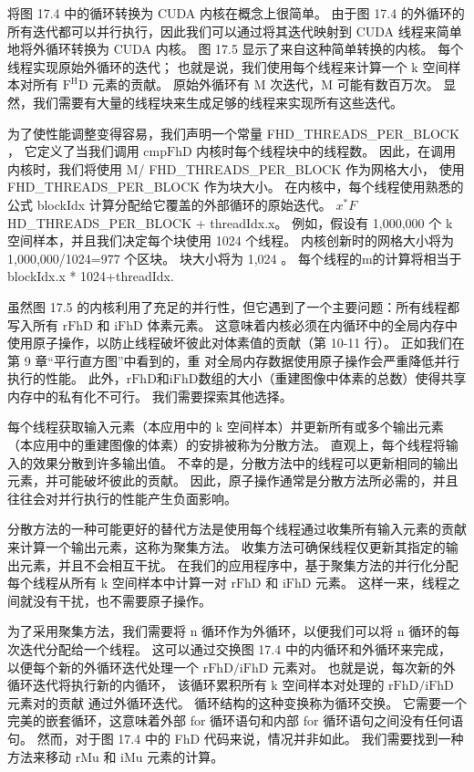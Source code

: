 将图 17.4 中的循环转换为 CUDA 内核在概念上很简单。 
由于图 17.4 的外循环的所有迭代都可以并行执行，因此我们可以通过将其迭代映射到 CUDA 线程来简单地将外循环转换为 CUDA 内核。 
图 17.5 显示了来自这种简单转换的内核。 每个线程实现原始外循环的迭代； 
也就是说，我们使用每个线程来计算一个 k 空间样本对所有 $\mathrm{F}^{\mathrm{H}} \mathrm{D}$ 元素的贡献。 
原始外循环有 $\mathrm{M}$ 次迭代，$\mathrm{M}$ 可能有数百万次。 
显然，我们需要有大量的线程块来生成足够的线程来实现所有这些迭代。

为了使性能调整变得容易，我们声明一个常量 FHD\_THREADS\_PER\_BLOCK ，
它定义了当我们调用 $\mathrm{cmpFhD}$ 内核时每个线程块中的线程数。 
因此，在调用内核时，我们将使用 M/ FHD\_THREADS\_PER\_BLOCK 作为网格大小，
使用 FHD\_THREADS\_PER\_BLOCK 作为块大小。 
在内核中，每个线程使用熟悉的公式 blockIdx 计算分配给它覆盖的外部循环的原始迭代。 
$x^{*} F$ HD\_THREADS\_PER\_BLOCK + threadIdx.x。 
例如，假设有 1,000,000 个 k 空间样本，并且我们决定每个块使用 1024 个线程。 
内核创新时的网格大小将为 1,000,000/1024=977 个区块。 块大小将为 1,024 。 
每个线程的$\mathrm{m}$的计算将相当于blockIdx.x * 1024+threadIdx.

虽然图 17.5 的内核利用了充足的并行性，但它遇到了一个主要问题：所有线程都写入所有 $\mathrm{rFhD}$ 
和 $\mathrm{iFhD}$ 体素元素。 
这意味着内核必须在内循环中的全局内存中使用原子操作，以防止线程破坏彼此对体素值的贡献（第 10-11 行）。 
正如我们在第 9 章“平行直方图”中看到的，重
对全局内存数据使用原子操作会严重降低并行执行的性能。 
此外，$\mathrm{rFhD}$和$\mathrm{iFhD}$数组的大小（重建图像中体素的总数）使得共享内存中的私有化不可行。 
我们需要探索其他选择。

每个线程获取输入元素（本应用中的 k 空间样本）并更新所有或多个输出元素（本应用中的重建图像的体素）的安排被称为分散方法。 
直观上，每个线程将输入的效果分散到许多输出值。 不幸的是，分散方法中的线程可以更新相同的输出元素，并可能破坏彼此的贡献。 
因此，原子操作通常是分散方法所必需的，并且往往会对并行执行的性能产生负面影响。

分散方法的一种可能更好的替代方法是使用每个线程通过收集所有输入元素的贡献来计算一个输出元素，这称为聚集方法。 
收集方法可确保线程仅更新其指定的输出元素，并且不会相互干扰。 
在我们的应用程序中，基于聚集方法的并行化分配每个线程从所有 $\mathrm{k}$ 空间样本中计算一对 $\mathrm{rFhD}$ 
和 $\mathrm{iFhD}$ 元素。 这样一来，线程之间就没有干扰，也不需要原子操作。

为了采用聚集方法，我们需要将 n 循环作为外循环，以便我们可以将 n 循环的每次迭代分配给一个线程。 
这可以通过交换图 17.4 中的内循环和外循环来完成，
以便每个新的外循环迭代处理一个 $\mathrm{rFhD} / \mathrm{iFhD}$ 元素对。 
也就是说，每次新的外循环迭代将执行新的内循环，
该循环累积所有 $\mathrm{k}$ 空间样本对处理的 $\mathrm{rFhD} / \mathrm{iFhD}$ 元素对的贡献 通过外循环迭代。 
循环结构的这种变换称为循环交换。 
它需要一个完美的嵌套循环，这意味着外部 for 循环语句和内部 for 循环语句之间没有任何语句。 
然而，对于图 17.4 中的 FhD 代码来说，情况并非如此。 我们需要找到一种方法来移动 rMu 和 iMu 元素的计算。

